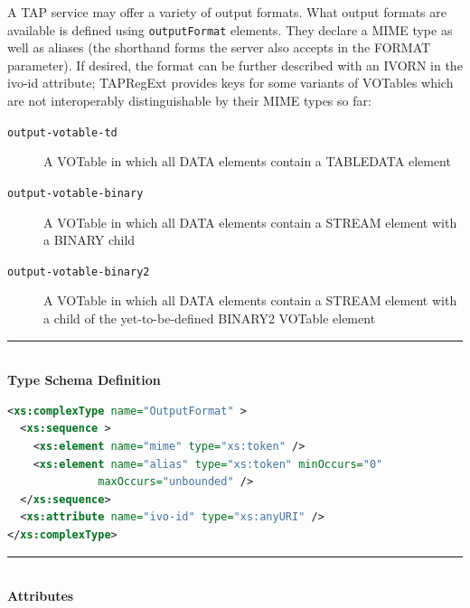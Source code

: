 \documentclass{ivoa}
\begin{document}
\label{outforms}

A TAP service may offer a variety of output formats.
What output formats are available is defined using
\texttt{outputFormat} elements.   They 
declare a MIME type \citep{std:RFC2045} as well
as aliases (the shorthand forms the server also accepts in the 
FORMAT parameter).  If desired, the format can be further described with an
IVORN in the ivo-id attribute; TAPRegExt provides keys for some variants of
VOTables which are not interoperably distinguishable by their MIME types so far:


\begin{description}
\item[\texttt{output-votable-td}]A VOTable in which all DATA elements contain a TABLEDATA element
\item[\texttt{output-votable-binary}]A VOTable in which all DATA elements contain a STREAM element
	with a BINARY child
\item[\texttt{output-votable-binary2}]A VOTable in which all DATA elements contain a STREAM element
	with a child of the yet-to-be-defined BINARY2 VOTable element
\end{description}

\noindent\rule[-2pt]{\textwidth}{0.5pt}\\
			\textbf{ Type Schema Definition}

\begin{lstlisting}[language=XML]
<xs:complexType name="OutputFormat" >
  <xs:sequence >
    <xs:element name="mime" type="xs:token" />
    <xs:element name="alias" type="xs:token" minOccurs="0"
              maxOccurs="unbounded" />
  </xs:sequence>
  <xs:attribute name="ivo-id" type="xs:anyURI" />
</xs:complexType>
\end{lstlisting}

\noindent\rule[-2pt]{\textwidth}{0.5pt}\\
					\textbf{ Attributes}
\end{document}
